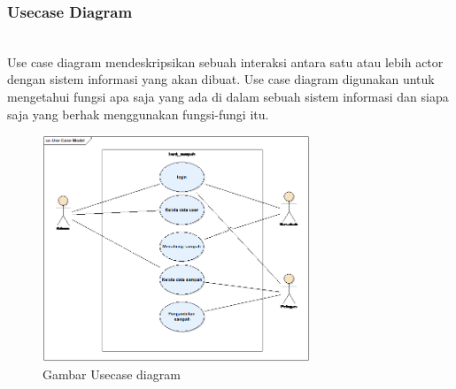 \subsubsection{Usecase Diagram}
\hfill\\
Use case diagram mendeskripsikan sebuah interaksi antara satu atau lebih actor dengan sistem informasi yang akan dibuat. Use case diagram digunakan untuk mengetahui fungsi apa saja yang ada di dalam sebuah sistem informasi dan siapa saja yang berhak menggunakan fungsi-fungi itu.
	\begin{figure}[H]
		\includegraphics[width=8cm]{figures/analisis/4.png}
		\centering
		\caption{Gambar Usecase diagram}
	\end{figure}
